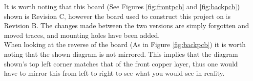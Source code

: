 \documentclass[12pt,a4paper]{report}
\begin{document}
It is worth noting that this board (See Figures \ref{fig:frontpcb} and \ref{fig:backpcb}) shown is Revision C, however the board used to construct this project on is Revision B. The changes made between the two versions are simply forgotten and moved traces, and mounting holes have been added.\\
When looking at the reverse of the board (As in Figure \ref{fig:backpcb}) it is worth noting that the shown diagram is not mirrored. This implies that the diagram shown's top left corner matches that of the front copper layer, thus one would have to mirror this from left to right to see what you would see in reality.

\newpage
\end{document}
